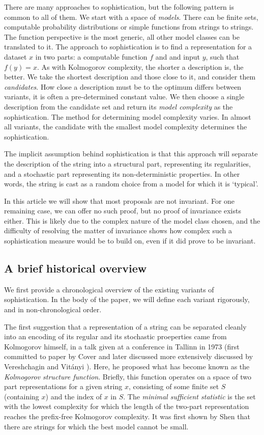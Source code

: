 \documentclass{style/llncs}
\begin{document}
There are many approaches to sophistication, but the following pattern is common to all of them. We start with a space of \emph{models}. There can be finite sets, computable probability distributions or simple functions from strings to strings. The function perspective is the most generic, all other model classes can be translated to it. The approach to sophistication is to find a representation for a dataset $x$ in two parts: a computable function $f$ and and input $y$, such that $f(y) = x$. As with Kolmogorov complexity, the shorter a description is, the better. We take the shortest description and those close to it, and consider them \emph{candidates}. How close a description must be to the optimum differs between variants, it is often a pre-determined constant value. We then choose a single description from the candidate set and return its \emph{model complexity} as the sophistication. The method for determining model complexity varies. In almost all variants, the candidate with the smallest model complexity determines the sophistication. 

The implicit assumption behind sophistication is that this approach will separate the description of the string into a structural part, representing its regularities, and a stochastic part representing its non-deterministic properties. In other words, the string is cast as a random choice from a model for which it is `typical'.  

In this article we will show that most proposals are not invariant. For one remaining case, we can offer no such proof, but no proof of invariance exists either. This is likely due to the complex nature of the model class chosen, and the difficulty of resolving the matter of invariance shows how complex such a sophistication measure would be to build on, even if it did prove to be invariant.

\subsection{A brief historical overview}

We first provide a chronological overview of the existing variants of sophistication. In the body of the paper, we will define each variant rigorously, and in non-chronological order.

The first suggestion that a representation of a string can be separated cleanly into an encoding of its regular and its stochastic proeperties came from Kolmogorov himself, in a talk given at a conference in Tallinn in 1973 (first committed to paper by Cover \cite{cover1985kolmogorov} and later discussed more extensively discussed by Vereshchagin and Vit\'anyi \cite{vereshchagin2004kolmogorov}). Here, he proposed what has become known as the \emph{Kolmogorov structure function}. Briefly, this function operates on a space of two part representations for a given string $x$, consisting of some finite set $S$ (containing $x$) and the index of $x$ in $S$. The \emph{minimal sufficient statistic} is the set with the lowest complexity for which the length of the two-part representation reaches the prefix-free Kolmogorov complexity. It was first shown by Shen \cite{shen1983concept} that there are strings for which the best model cannot be small.
\end{document}

